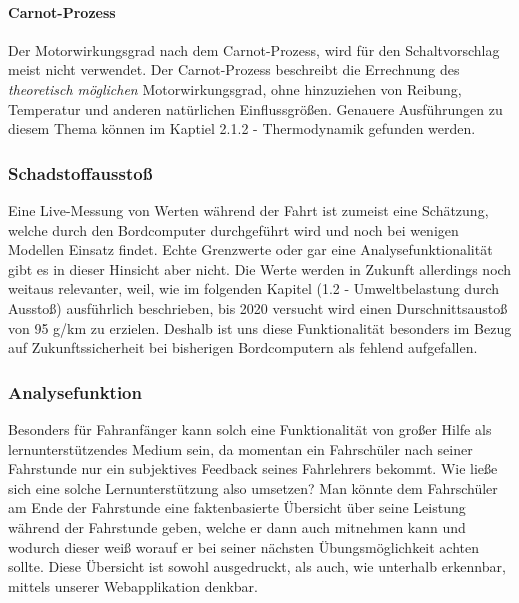 \paragraph{Carnot-Prozess}
Der Motorwirkungsgrad nach dem Carnot-Prozess, wird für den Schaltvorschlag meist nicht verwendet. Der Carnot-Prozess beschreibt die Errechnung des \textit{theoretisch möglichen} Motorwirkungsgrad, ohne hinzuziehen von Reibung, Temperatur und anderen natürlichen Einflussgrößen. \cite{SIMR.CH1-Fahrstil-Analyse.CarnotWirkungsgrad} Genauere Ausführungen zu diesem Thema können im Kaptiel 2.1.2 - Thermodynamik gefunden werden. 

\subsubsection{Schadstoffausstoß}
Eine Live-Messung von  Werten während der Fahrt ist zumeist eine Schätzung, welche durch den Bordcomputer durchgeführt wird und noch bei wenigen Modellen Einsatz findet. Echte Grenzwerte oder gar eine Analysefunktionalität gibt es in dieser Hinsicht aber nicht. Die  Werte werden in Zukunft allerdings noch weitaus relevanter, weil, wie im folgenden Kapitel (1.2 - Umweltbelastung durch  Ausstoß) ausführlich beschrieben, bis 2020 versucht wird einen Durschnittsaustoß von 95 g/km zu erzielen. \cite{SIMR.CH1-Fahrstil_Analyse.EUVerordCO2} Deshalb ist uns diese Funktionalität besonders im Bezug auf Zukunftssicherheit bei bisherigen Bordcomputern als fehlend aufgefallen.

\subsubsection{Analysefunktion}
Besonders für Fahranfänger kann solch eine Funktionalität von großer Hilfe als lernunterstützendes Medium sein, da momentan ein Fahrschüler nach seiner Fahrstunde nur ein subjektives Feedback seines Fahrlehrers bekommt. Wie ließe sich eine solche Lernunterstützung also umsetzen?
Man könnte dem Fahrschüler am Ende der Fahrstunde eine faktenbasierte Übersicht über seine Leistung während der Fahrstunde geben, welche er dann auch mitnehmen kann und wodurch dieser weiß worauf er bei seiner nächsten Übungsmöglichkeit achten sollte. Diese Übersicht ist sowohl ausgedruckt, als auch, wie unterhalb erkennbar, mittels unserer Webapplikation denkbar.



